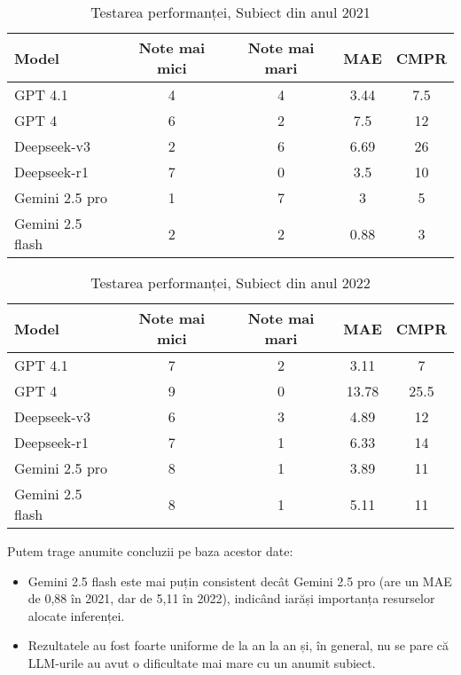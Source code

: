 \documentclass[12pt, a4paper]{report}
\begin{document}
\begin{table}[H]
\centering
\begin{tabular}{|l|c|c|c|c|}
\hline
\textbf{Model}           & \textbf{Note mai mici} & \textbf{Note mai mari} & \textbf{MAE} & \textbf{CMPR} \\
\hline
GPT 4.1                  & 4                  & 4                  & 3.44         & 7.5           \\
GPT 4                    & 6                  & 2                  & 7.5          & 12            \\
Deepseek-v3              & 2                  & 6                  & 6.69         & 26            \\
Deepseek-r1              & 7                  & 0                  & 3.5          & 10            \\
Gemini 2.5 pro           & 1                  & 7                  & 3            & 5             \\
Gemini 2.5 flash         & 2                  & 2                  & 0.88         & 3             \\
\hline
\end{tabular}
\caption{Testarea performanței, Subiect din anul 2021}
\end{table}

\begin{table}[H]
\centering
\begin{tabular}{|l|c|c|c|c|}
\hline
\textbf{Model} & \textbf{Note mai mici} & \textbf{Note mai mari} & \textbf{MAE} & \textbf{CMPR} \\
\hline
GPT 4.1            & 7 & 2 & 3.11  & 7     \\
GPT 4              & 9 & 0 & 13.78 & 25.5  \\
Deepseek-v3        & 6 & 3 & 4.89  & 12    \\
Deepseek-r1        & 7 & 1 & 6.33  & 14    \\
Gemini 2.5 pro     & 8 & 1 & 3.89  & 11    \\
Gemini 2.5 flash   & 8 & 1 & 5.11  & 11    \\
\hline
\end{tabular}
\caption{Testarea performanței, Subiect din anul 2022}
\end{table}



Putem trage anumite concluzii pe baza acestor date:
\begin{itemize}
\item Gemini 2.5 flash este mai puțin consistent decât Gemini 2.5 pro (are un MAE de 0,88 în 2021, dar de 5,11 în 2022),
indicând iarăși importanța resurselor alocate inferenței.
\item Rezultatele au fost foarte uniforme de la an la an și, în general, nu se pare că LLM-urile au avut o dificultate mai mare cu un anumit subiect.
\end{itemize}
\end{document}
